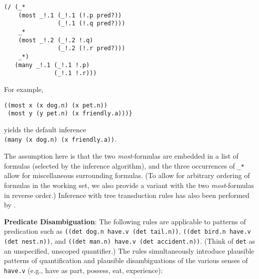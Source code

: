 \documentclass[a4,11pt]{article}
\begin{document}
%
\small
\begin{verbatim}
(/ (_* 
    (most _!.1 (_!.1 (!.p pred?)) 
               (_!.1 (!.q pred?))) 
    _* 
    (most _!.2 (_!.2 !.q) 
               (_!.2 (!.r pred?))) 
    _*)
   (many _!.1 (_!.1 !.p) 
              (_!.1 !.r)))
\end{verbatim}

\normalsize
For example, 

\small
\begin{verbatim}
((most x (x dog.n) (x pet.n)) 
 (most y (y pet.n) (x friendly.a)))}
\end{verbatim}

\normalsize
 yields the default inference\\
 {\small\tt (many (x dog.n) (x friendly.a))}.

The assumption here is that the two {\it most}-formulas are embedded in a list of formulas (selected by the inference algorithm), and the three occurrences of \texttt{\_*} allow for miscellaneous surrounding formulas. (To allow for arbitrary ordering of formulas in the working set, we also provide a variant with the two {\it most}-formulas in reverse order.)  Inference with tree transduction rules has also been performed by \cite{Koller:2010}.



{\bf Predicate Disambiguation}:
The following rules are applicable to patterns of predication such as {\small\tt ((det dog.n have.v (det tail.n))}, {\small\tt ((det bird.n have.v (det nest.n))}, and {\small\tt ((det man.n) have.v (det accident.n))}. (Think of {\small\tt det} as an unspecified, unscoped quantifier.) The rules simultaneously introduce plausible patterns of quantification and plausible disambiguations of the various senses of {\small\tt have.v} (e.g., have as part, possess, eat, experience):
\end{document}

